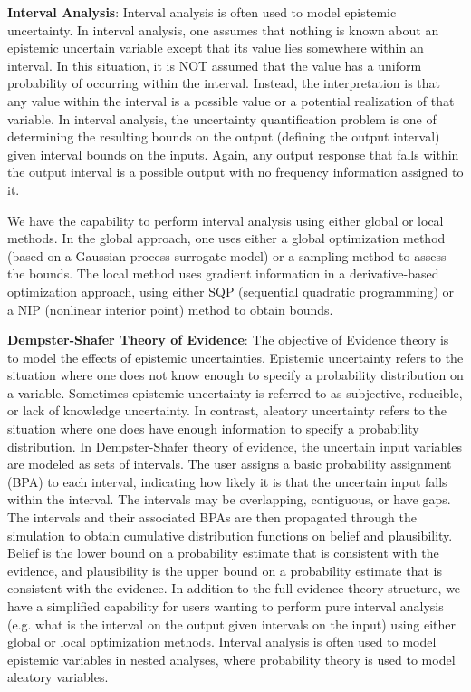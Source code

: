 \textbf{Interval Analysis}: Interval analysis is often used to model 
epistemic uncertainty. In interval analysis, one assumes that nothing 
is known about an epistemic uncertain variable except that its value lies 
somewhere within an interval. In this situation, it is NOT 
assumed that the value has a uniform probability of occurring 
within the interval. Instead, the interpretation is that 
any value within the interval is a possible value or a potential 
realization of that variable. In interval analysis, the 
uncertainty quantification problem is one of determining the 
resulting bounds on the output (defining the output interval) 
given interval bounds on the inputs. Again, any output response 
that falls within the output interval is a possible output 
with no frequency information assigned to it.

We have the capability to perform interval analysis using either
global or local methods. In the global approach, one uses either a 
global optimization method (based on a Gaussian process surrogate model)
or a sampling method to assess the bounds. The
local method uses gradient information in a derivative-based 
optimization approach, using either SQP (sequential quadratic 
programming) or a NIP (nonlinear interior point) method to obtain bounds. 
 
\textbf{Dempster-Shafer Theory of Evidence}: The objective of Evidence
theory is to model the effects of epistemic uncertainties. Epistemic
uncertainty refers to the situation where one does not know enough
to specify a probability distribution on a variable. Sometimes epistemic
uncertainty is referred to as subjective, reducible, or lack of knowledge
uncertainty. In contrast, aleatory uncertainty refers to the situation
where one does have enough information to specify a probability distribution.
In Dempster-Shafer theory of evidence, the uncertain input variables
are modeled as sets of intervals. The user assigns a basic probability
assignment (BPA) to each interval, indicating how likely it is that the
uncertain input falls within the interval. The intervals may be
overlapping, contiguous, or have gaps. The intervals and their associated
BPAs are then propagated through the simulation to obtain cumulative
distribution functions on belief and plausibility. Belief is the lower
bound on a probability estimate that is consistent with the evidence, and
plausibility is the upper bound on a probability estimate that is consistent
with the evidence. In addition to the full evidence theory structure, 
we have a simplified capability for users wanting to perform pure 
interval analysis (e.g. what is the interval on the output given 
intervals on the input) using either global or local optimization methods. 
Interval analysis is often used to model epistemic variables in 
nested analyses, where probability theory is used to model aleatory variables.

